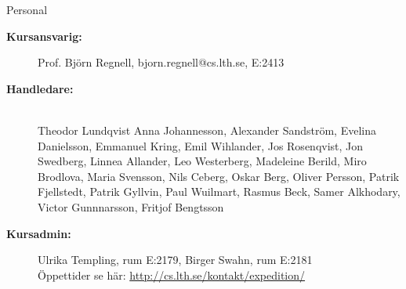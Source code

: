 \ifkompendium\else
\begin{SlideExtra}{Personal \CurrentYear}\SlideFontSmall
\begin{description}
\item [\bfseries Kursansvarig:] Prof. Björn Regnell, bjorn.regnell@cs.lth.se, E:2413
\item [\bfseries Handledare:]\\
\TODO
Theodor Lundqvist
Anna	Johannesson,
Alexander	Sandström,
Evelina	Danielsson,
Emmanuel	Kring,
Emil	Wihlander,
Jos	Rosenqvist,
Jon	Swedberg,
Linnea	Allander,
Leo	Westerberg,
Madeleine	Berild,
Miro	Brodlova,
Maria	Svensson,
Nils	Ceberg,
Oskar	Berg,
Oliver	Persson,
Patrik	Fjellstedt,
Patrik	Gyllvin,
Paul	Wuilmart,
Rasmus	Beck,
Samer	Alkhodary,
Victor Gunnnarsson,
Fritjof	Bengtsson
\item [\bfseries Kursadmin:]
Ulrika Templing, rum E:2179, Birger Swahn, rum E:2181 \\
Öppettider se här: 
\url{http://cs.lth.se/kontakt/expedition/} \\
\end{description}
\end{SlideExtra}
\fi


